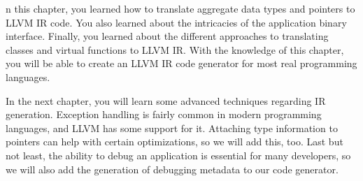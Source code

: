 n this chapter, you learned how to translate aggregate data types and pointers to LLVM IR code. You also learned about the intricacies of the application binary interface. Finally, you learned about the different approaches to translating classes and virtual functions to LLVM IR. With the knowledge of this chapter, you will be able to create an LLVM IR code generator for most real programming languages.

In the next chapter, you will learn some advanced techniques regarding IR generation. Exception handling is fairly common in modern programming languages, and LLVM has some support for it. Attaching type information to pointers can help with certain optimizations, so we will add this, too. Last but not least, the ability to debug an application is essential for many developers, so we will also add the generation of debugging metadata to our code generator.